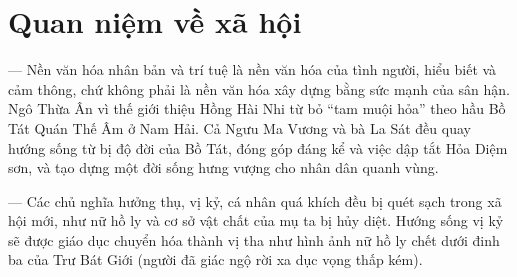 \section{Quan niệm về xã hội} %
\label{sec:59_60_xa_hoi}

— Nền văn hóa nhân bản và trí tuệ là nền văn hóa của tình người, hiểu biết và cảm thông, chứ không phải là nền văn hóa xây dựng bằng sức mạnh của sân hận. Ngô Thừa Ân vì thế giới thiệu Hồng Hài Nhi từ bỏ ``tam muội hỏa'' theo hầu Bồ Tát Quán Thế Âm ở Nam Hải. Cả Ngưu Ma Vương và bà La Sát đều quay hướng sống từ bị độ đời của Bồ Tát, đóng góp đáng kể và việc dập tắt Hỏa Diệm sơn, và tạo dựng một đời sống hưng vượng cho nhân dân quanh vùng.

— Các chủ nghĩa hưởng thụ, vị kỷ, cá nhân quá khích đều bị quét sạch trong xã hội mới, như nữ hồ ly và cơ sở vật chất của mụ ta bị hủy diệt. Hướng sống vị kỷ sẽ được giáo dục chuyển hóa thành vị tha như hình ảnh nữ hồ ly chết dưới đinh ba của Trư Bát Giới (người đã giác ngộ rời xa dục vọng thấp kém).
